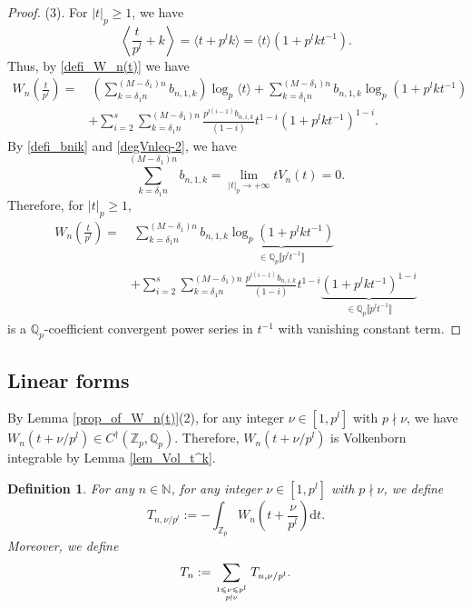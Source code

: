 \documentclass[12pt]{article}
\newtheorem{definition}[theorem]{Definition}
\numberwithin{equation}{section}
\begin{document}
\begin{proof}
(3). For $|t|_p \geqslant 1$, we have
\[ \left\langle \frac{t}{p^l} + k \right\rangle = \langle t + p^lk \rangle = \langle t \rangle (1+ p^{l}k t^{-1}). \]
Thus, by \eqref{defi_W_n(t)} we have
\begin{align*}
W_n\left(\frac{t}{p^l}\right) =&~ \left(\sum_{k=\delta_1 n}^{(M-\delta_1)n} b_{n,1,k}\right) \log_p\langle t \rangle + \sum_{k=\delta_1 n}^{(M-\delta_1)n} b_{n,1,k} \log_p(1+ p^{l}k t^{-1}) \\
&+ \sum_{i=2}^{s} \sum_{k=\delta_1 n}^{(M-\delta_1)n} \frac{p^{l(i-1)}b_{n,i,k}}{(1-i)} t^{1-i} (1+p^l k t^{-1})^{1-i}.
\end{align*}
By \eqref{defi_bnik} and \eqref{degVnleq-2}, we have
\begin{equation}\label{sigma_1=0}
\sum_{k=\delta_1 n}^{(M-\delta_1)n} b_{n,1,k} = \lim_{|t|_p \to +\infty} tV_n(t) = 0. 
\end{equation}
Therefore, for $|t|_p \geqslant 1$, 
\begin{align*}
W_n\left(\frac{t}{p^l}\right) =&~ \sum_{k=\delta_1 n}^{(M-\delta_1)n} b_{n,1,k} \underbrace{\log_p(1+ p^{l}k t^{-1})}_{\in \mathbb{Q}_p\llbracket p^{l}t^{-1}\rrbracket} \\
&+ \sum_{i=2}^{s} \sum_{k=\delta_1 n}^{(M-\delta_1)n} \frac{p^{l(i-1)}b_{n,i,k}}{(1-i)} t^{1-i} \underbrace{(1+p^l k t^{-1})^{1-i}}_{\in \mathbb{Q}_p\llbracket p^{l}t^{-1}\rrbracket}
\end{align*}
is a $\mathbb{Q}_p$-coefficient convergent power series in $t^{-1}$ with vanishing constant term.
\end{proof}




\subsection{Linear forms}

By Lemma \ref{prop_of_W_n(t)}(2), for any integer $\nu \in [1,p^l]$ with $p \nmid \nu$, we have $W_n\left( t+\nu/p^{l} \right)  \in C^\dagger(\mathbb{Z}_p,\mathbb{Q}_p)$. Therefore, $W_n\left( t+\nu/p^{l} \right)$ is Volkenborn integrable by Lemma \ref{lem_Vol_t^k}.

\begin{definition}\label{def_T_n}
For any $n \in \mathbb{N}$, for any integer $\nu \in [1,p^l]$ with $p \nmid \nu$, we define
\begin{equation}\label{def_Tntheta}
T_{n,\nu/p^l} :=  -\int_{\mathbb{Z}_p} W_n\left(t+\frac{\nu}{p^l}\right)\mathrm{d}t. 
\end{equation}
Moreover, we define
\begin{equation}\label{def_Tn}
T_n:= \sum_{1 \leqslant \nu \leqslant p^l \atop p \nmid \nu} T_{n,\nu/p^l}.
\end{equation}
\end{definition}
\end{document}
